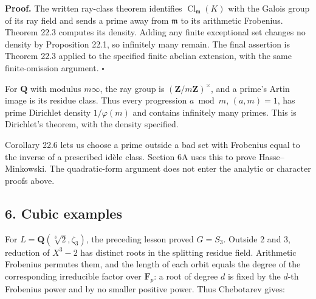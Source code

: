 \documentclass[11pt,a4paper]{article}
\begin{document}
\textbf{Proof.} The written ray-class theorem identifies
\(\operatorname{Cl}_{\mathfrak m}(K)\) with the Galois group of its ray
field and sends a prime away from \(\mathfrak m\) to its arithmetic
Frobenius. Theorem 22.3 computes its density. Adding any finite
exceptional set changes no density by Proposition 22.1, so infinitely
many remain. The final assertion is Theorem 22.3 applied to the
specified finite abelian extension, with the same finite-omission
argument. \(\square\)

For \(\mathbf Q\) with modulus \(m\infty\), the ray group is
\((\mathbf Z/m\mathbf Z)^\times\), and a prime's Artin image is its
residue class. Thus every progression \(a\bmod m\), \((a,m)=1\), has
prime Dirichlet density \(1/\varphi(m)\) and contains infinitely many
primes. This is Dirichlet's theorem, with the density specified.

Corollary 22.6 lets us choose a prime outside a bad set with Frobenius
equal to the inverse of a prescribed idèle class. Section 6A uses this
to prove Hasse--Minkowski. The quadratic-form argument does not enter
the analytic or character proofs above.

\subsection{6. Cubic examples}\label{cubic-examples}

For \(L=\mathbf Q(\sqrt[3]2,\zeta_3)\), the preceding lesson proved
\(G=S_3\). Outside 2 and 3, reduction of \(X^3-2\) has distinct roots in
the splitting residue field. Arithmetic Frobenius permutes them, and the
length of each orbit equals the degree of the corresponding irreducible
factor over \(\mathbf F_p\): a root of degree \(d\) is fixed by the
\(d\)-th Frobenius power and by no smaller positive power. Thus
Chebotarev gives:
\end{document}

